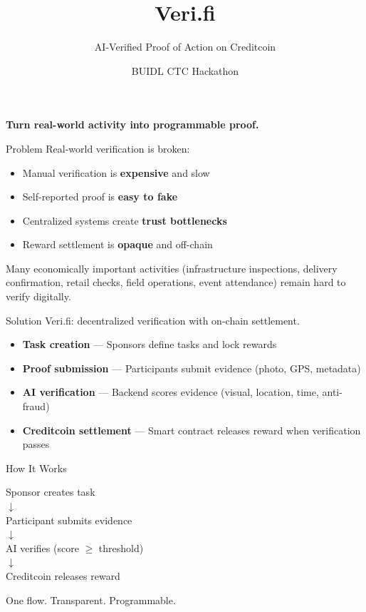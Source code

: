 \documentclass[11pt]{beamer}
\title{Veri.fi}
\subtitle{AI-Verified Proof of Action on Creditcoin}
\author{BUIDL CTC Hackathon}
\institute{Build for the Real World}
\date{}
\begin{document}
\begin{frame}
\titlepage
\vspace{-0.5em}
\begin{center}
\large \textbf{Turn real-world activity into programmable proof.}
\end{center}
\end{frame}

\begin{frame}{Problem}
Real-world verification is broken:
\begin{itemize}
\item Manual verification is \textbf{expensive} and slow
\item Self-reported proof is \textbf{easy to fake}
\item Centralized systems create \textbf{trust bottlenecks}
\item Reward settlement is \textbf{opaque} and off-chain
\end{itemize}
\vspace{0.5em}
Many economically important activities (infrastructure inspections, delivery confirmation, retail checks, field operations, event attendance) remain hard to verify digitally.
\end{frame}

\begin{frame}{Solution}
Veri.fi: decentralized verification with on-chain settlement.
\begin{itemize}
\item \textbf{Task creation} — Sponsors define tasks and lock rewards
\item \textbf{Proof submission} — Participants submit evidence (photo, GPS, metadata)
\item \textbf{AI verification} — Backend scores evidence (visual, location, time, anti-fraud)
\item \textbf{Creditcoin settlement} — Smart contract releases reward when verification passes
\end{itemize}
\end{frame}

\begin{frame}{How It Works}
\begin{center}
Sponsor creates task \\
$\downarrow$ \\
Participant submits evidence \\
$\downarrow$ \\
AI verifies (score $\geq$ threshold) \\
$\downarrow$ \\
Creditcoin releases reward
\end{center}
\vspace{0.5em}
One flow. Transparent. Programmable.
\end{frame}
\end{document}
